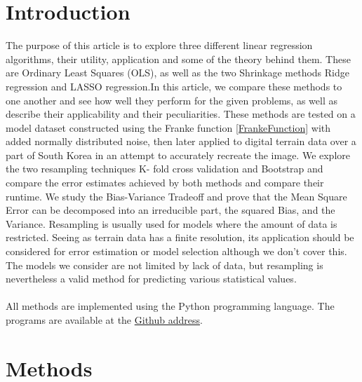 \documentclass[11pt,a4paper,titlepage]{article}
\begin{document}
\section{Introduction}
The purpose of this article is to explore three different linear regression algorithms, their utility, application and some of the theory behind them. These are Ordinary Least Squares (OLS), as well as the two Shrinkage methods Ridge regression and LASSO regression.In this article, we compare these methods to one another and see how well they perform for the given problems, as well as describe their applicability and their peculiarities. These methods are tested on a model dataset constructed using the Franke function \eqref{FrankeFunction} with added normally distributed noise, then later applied to digital terrain data over a part of South Korea in an attempt to accurately recreate the image. We explore the two resampling techniques K- fold cross validation and Bootstrap and compare the error estimates achieved by both methods and compare their runtime. We study the Bias-Variance Tradeoff and prove that the Mean Square Error can be decomposed into an irreducible part, the squared Bias, and the Variance. Resampling is usually used for models where the amount of data is restricted. Seeing as terrain data has a finite resolution, its application should be considered for error estimation or model selection although we don't cover this. The models we consider are not limited by lack of data, but resampling is nevertheless a valid method for predicting various statistical values.\\\\All methods are implemented using the Python programming language. The programs are available at the \href{https://github.com/schraderSimon/FYS-STK/tree/master/project1}{Github address}.
\section{Methods}
\end{document}
